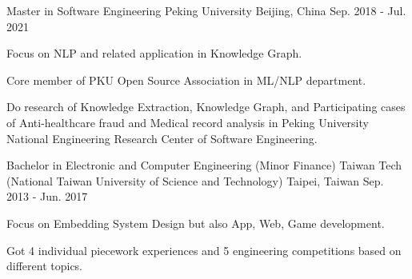 

\begin{cventries}

  \cventry
    {Master in Software Engineering} %
    {Peking University} %
    {Beijing, China} %
    {Sep. 2018 - Jul. 2021} %
    {
      \begin{cvitems} %
        \item {Focus on NLP and related application in Knowledge Graph.}
        \item {Core member of PKU Open Source Association in ML/NLP department.}
        \item {Do research of Knowledge Extraction, Knowledge Graph, and Participating cases of Anti-healthcare fraud and Medical record analysis in Peking University National Engineering Research Center of Software Engineering.}
      \end{cvitems}
    }


  \cventry
    {Bachelor in Electronic and Computer Engineering (Minor Finance)} %
    {Taiwan Tech (National Taiwan University of Science and Technology)} %
    {Taipei, Taiwan} %
    {Sep. 2013 - Jun. 2017} %
    {
      \begin{cvitems} %
        \item {Focus on Embedding System Design but also App, Web, Game development.}
        \item {Got 4 individual piecework experiences and 5 engineering competitions based on different topics.}
      \end{cvitems}
    }

\end{cventries}
